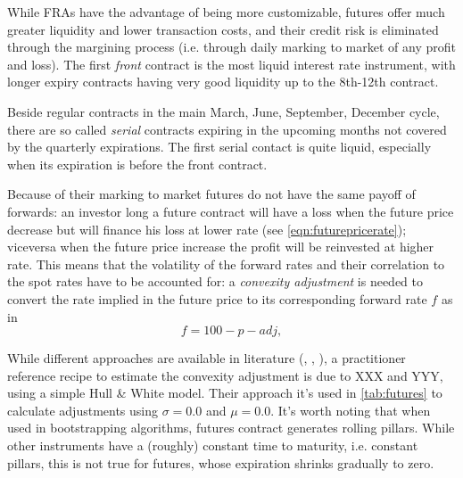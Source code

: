 \documentclass[11pt,reqno]{amsart}
\begin{document}
While FRAs have the advantage of being more customizable, futures offer much greater liquidity and lower transaction costs, and their credit risk is eliminated through the margining process (i.e. through daily marking to market of any profit and loss). The first {\it front} contract is the most liquid interest rate instrument, with longer expiry contracts having very good liquidity up to the 8th-12th contract.

Beside regular contracts in the main March, June, September, December cycle, there are so called {\it serial} contracts expiring in the upcoming months not covered by the quarterly expirations. The first serial contact is quite liquid, especially when its expiration is before the front contract.

Because of their marking to market futures do not have the same payoff of forwards: an investor long a future contract will have a loss when the future price decrease but will finance his loss at lower rate (see \ref{eqn:futurepricerate}); viceversa when the future price increase the profit will be reinvested at higher rate. This means that the volatility of the forward rates and their correlation to the spot rates have to be accounted for: a {\it convexity adjustment} is needed to convert the rate implied in the future price to its corresponding forward rate $f$ as in
\begin{equation}
f = 100 - p - adj,
\label{eqn:fwdfromfutureprice}
\end{equation}


\cite{}

While different approaches are available in literature (\cite{JaeckelCA}, \cite{PiterbargCA}, \cite{Vaillant}), a practitioner reference recipe to estimate the convexity adjustment is due to  XXX and YYY, using a simple Hull \& White model. Their approach it's used in \ref{tab:futures} to calculate adjustments using
$\sigma = 0.0$ and $\mu = 0.0$.
It's worth noting that when used in bootstrapping algorithms, futures contract generates rolling pillars. While other instruments have a (roughly) constant time to maturity, i.e. constant pillars, this is not true for futures, whose expiration shrinks gradually to zero.
\end{document}
